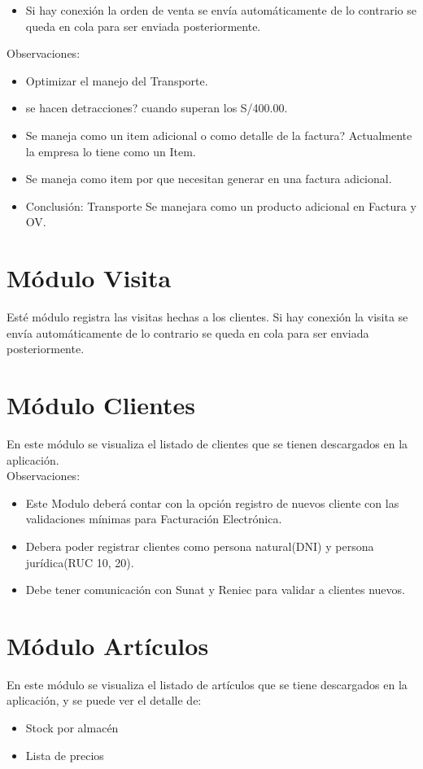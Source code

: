 \documentclass[pdftex,12pt,oneside,a4paper,spanish, english, brazil]{abntex2}
\begin{document}
\begin{sloppypar}
\begin{itemize}
              	\item Si hay conexión la orden de venta se envía automáticamente de lo contrario se queda en cola para ser enviada posteriormente.
            \end{itemize}
        Observaciones:
        \begin{itemize}
        	\item  Optimizar el manejo del Transporte.
        	\item  se hacen detracciones? cuando superan los S/400.00.
        	\item  Se maneja como un item adicional o como detalle de la factura? Actualmente la empresa lo tiene como un Item.
        	\item  Se maneja como item por que necesitan generar en una factura adicional.
        	\item Conclusión: Transporte Se manejara como un producto adicional en Factura y OV.
        \end{itemize}
             \section{Módulo Visita}
             Esté módulo registra las visitas hechas a los clientes. Si hay conexión la visita se envía automáticamente de lo contrario se queda en cola para ser enviada posteriormente.
             
             \section{Módulo Clientes} 
             En este módulo se visualiza el listado de clientes que se tienen descargados en la aplicación.\\
             Observaciones:
             \begin{itemize}
             	\item Este Modulo deberá contar con la opción  registro de nuevos cliente con las validaciones mínimas para Facturación Electrónica.
             	\item Debera poder registrar clientes como persona natural(DNI) y persona jurídica(RUC 10, 20).
             	\item Debe tener comunicación con Sunat y Reniec para validar a clientes nuevos.
             \end{itemize}
             
             \section{Módulo Artículos}
             En este módulo se visualiza el listado de artículos que se tiene descargados en la aplicación, y se puede ver el detalle de:
             \begin{itemize}
             	\item Stock por almacén
             	\item Lista de precios
             \end{itemize}
             

\end{sloppypar}
\end{document}
